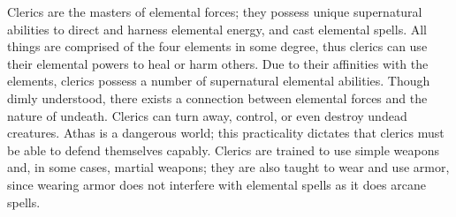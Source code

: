 \documentclass[10pt,a4paper,twocolumn]{d20}
\begin{document}
{Clerics are the masters of elemental forces; they possess unique supernatural abilities to direct and harness elemental energy, and cast elemental spells. All things are comprised of the four elements in some degree, thus clerics can use their elemental powers to heal or harm others. Due to their affinities with the elements, clerics possess a number of supernatural elemental abilities. Though dimly understood, there exists a connection between elemental forces and the nature of undeath. Clerics can turn away, control, or even destroy undead creatures. Athas is a dangerous world; this practicality dictates that clerics must be able to defend themselves capably. Clerics are trained to use simple weapons and, in some cases, martial weapons; they are also taught to wear and use armor, since wearing armor does not interfere with elemental spells as it does arcane spells.


}
\end{document}
